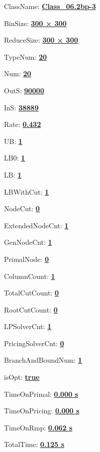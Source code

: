 \documentclass[11pt]{article}
\begin{document}
\pagestyle{empty}


ClassName: \underline{\textbf{Class_06.2bp-3}}
\par
BinSize: \underline{\textbf{300 × 300}}
\par
ReduceSize: \underline{\textbf{300 × 300}}
\par
TypeNum: \underline{\textbf{20}}
\par
Num: \underline{\textbf{20}}
\par
OutS: \underline{\textbf{90000}}
\par
InS: \underline{\textbf{38889}}
\par
Rate: \underline{\textbf{0.432}}
\par
UB: \underline{\textbf{1}}
\par
LB0: \underline{\textbf{1}}
\par
LB: \underline{\textbf{1}}
\par
LBWithCut: \underline{\textbf{1}}
\par
NodeCut: \underline{\textbf{0}}
\par
ExtendedNodeCnt: \underline{\textbf{1}}
\par
GenNodeCnt: \underline{\textbf{1}}
\par
PrimalNode: \underline{\textbf{0}}
\par
ColumnCount: \underline{\textbf{1}}
\par
TotalCutCount: \underline{\textbf{0}}
\par
RootCutCount: \underline{\textbf{0}}
\par
LPSolverCnt: \underline{\textbf{1}}
\par
PricingSolverCnt: \underline{\textbf{0}}
\par
BranchAndBoundNum: \underline{\textbf{1}}
\par
isOpt: \underline{\textbf{true}}
\par
TimeOnPrimal: \underline{\textbf{0.000 s}}
\par
TimeOnPricing: \underline{\textbf{0.000 s}}
\par
TimeOnRmp: \underline{\textbf{0.062 s}}
\par
TotalTime: \underline{\textbf{0.125 s}}
\par
\newpage
\end{document}

